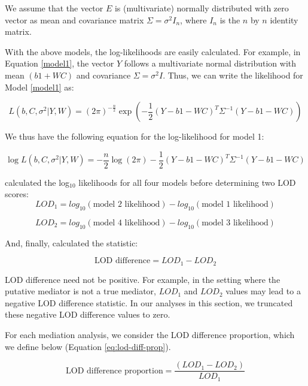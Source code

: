 \documentclass{book}
\begin{document}
We assume that the vector $E$ is (multivariate) normally distributed with zero vector as mean and covariance matrix $\Sigma = \sigma^2I_n$, where $I_n$ is the $n$ by $n$ identity matrix.

With the above models, the log-likelihoods are easily calculated. For example, in Equation \ref{model1}, the vector $Y$ follows a multivariate normal distribution with mean $(b1 + WC)$ and covariance $\Sigma = \sigma^2I$. Thus, we can write the likelihood for Model \ref{model1} as:

\begin{equation}
    L(b, C, \sigma^2| Y, W) = (2\pi)^{- \frac{n}{2}}\exp{ \left(- \frac{1}{2}(Y - b1 - WC)^T\Sigma^{-1}(Y - b1 - WC)\right)}
\end{equation}

We thus have the following equation for the log-likelihood for model 1:

\begin{equation}
    \log L(b, C, \sigma^2 | Y, W) = - \frac{n}{2}\log (2\pi) - \frac{1}{2} (Y - b1 - WC)^T\Sigma^{-1}(Y - b1 - WC)
\end{equation}


\citet{chick2016defining} calculated the log$_{10}$ likelihoods for all four models before determining two LOD scores:
\begin{equation}
LOD_1 = log_{10}(\text{model 2 likelihood}) - log_{10}(\text{model 1 likelihood})
\end{equation}

\begin{equation}
LOD_2 = log_{10}(\text{model 4 likelihood}) - log_{10}(\text{model 3 likelihood})
\end{equation}

And, finally, \citet{chick2016defining} calculated the statistic:

\begin{equation}
\text{LOD difference} = LOD_1 - LOD_2
\end{equation}

LOD difference need not be positive. For example, in the setting where the putative mediator is not a true mediator, $LOD_1$ and $LOD_2$ values may lead to a negative LOD difference statistic. In our analyses in this section, we truncated these negative LOD difference values to zero.

For each mediation analysis, we consider the LOD difference proportion, which we define below (Equation \ref{eq:lod-diff-prop}).

\begin{equation}
\text{LOD difference proportion} = \frac{(LOD_1 - LOD_2)}{LOD_1}
\label{eq:lod-diff-prop}
\end{equation}
\end{document}
